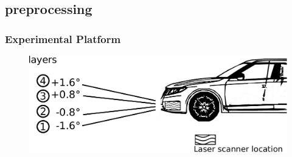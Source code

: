 \documentclass{beamer}
\begin{document}
\subsection{preprocessing}

	\begin{frame}
		\frametitle{Experimental Platform}
		\begin{figure}[h]
			\center
			\includegraphics[scale=0.4]{../img/fig:demonstrator:lateral}
		\end{figure}
	\end{frame}
\end{document}
